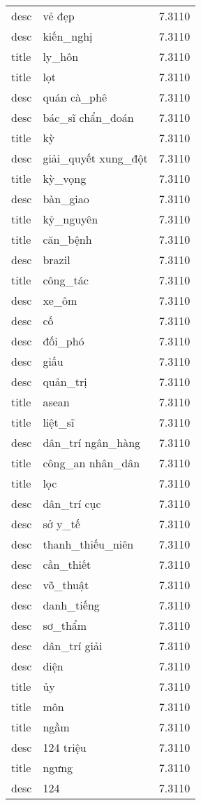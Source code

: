 \documentclass{article}
\begin{document}
\begin{tabular}{lll}
desc & vẻ đẹp & 7.3110\\
desc & kiến\_nghị & 7.3110\\
title & ly\_hôn & 7.3110\\
title & lọt & 7.3110\\
desc & quán cà\_phê & 7.3110\\
desc & bác\_sĩ chẩn\_đoán & 7.3110\\
title & kỳ & 7.3110\\
desc & giải\_quyết xung\_đột & 7.3110\\
title & kỳ\_vọng & 7.3110\\
desc & bàn\_giao & 7.3110\\
title & kỷ\_nguyên & 7.3110\\
title & căn\_bệnh & 7.3110\\
desc & brazil & 7.3110\\
title & công\_tác & 7.3110\\
desc & xe\_ôm & 7.3110\\
desc & cố & 7.3110\\
desc & đối\_phó & 7.3110\\
desc & giấu & 7.3110\\
desc & quản\_trị & 7.3110\\
title & asean & 7.3110\\
title & liệt\_sĩ & 7.3110\\
desc & dân\_trí ngân\_hàng & 7.3110\\
title & công\_an nhân\_dân & 7.3110\\
title & lọc & 7.3110\\
desc & dân\_trí cục & 7.3110\\
desc & sở y\_tế & 7.3110\\
desc & thanh\_thiếu\_niên & 7.3110\\
desc & cần\_thiết & 7.3110\\
desc & võ\_thuật & 7.3110\\
desc & danh\_tiếng & 7.3110\\
desc & sơ\_thẩm & 7.3110\\
desc & dân\_trí giải & 7.3110\\
desc & diện & 7.3110\\
title & ủy & 7.3110\\
title & môn & 7.3110\\
title & ngầm & 7.3110\\
desc & 124 triệu & 7.3110\\
title & ngưng & 7.3110\\
desc & 124 & 7.3110\\

\end{tabular}
\end{document}
